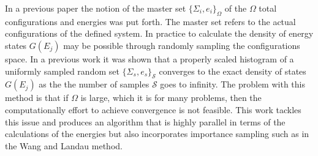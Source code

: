 \documentclass[aps,prl,reprint,superscriptaddress,showkeys]{revtex4-1}
\begin{document}
In a previous paper the notion of the master set $\{ \Sigma_i, e_i \}_\Omega $ of the $\Omega$ total configurations and energies was put forth. The master set refers to the actual configurations of the defined system. In practice to calculate the density of energy states $G(E_j)$  may be possible through randomly sampling the configurations space.  In a previous work it was shown that a properly scaled histogram of a uniformly sampled random set $\{ \Sigma_s, e_s \}_\mathcal{S}$ converges to the exact density of states $G(E_j)$ as the the number of samples $\mathcal{S}$ goes to infinity. The problem with this method is that if $\Omega$ is large, which it is for many problems,  then the computationally effort to achieve convergence is not feasible.  This work tackles this issue and produces an algorithm that is highly parallel in terms of the calculations of the energies  but also incorporates importance sampling such as in the Wang and Landau method. 
\end{document}
